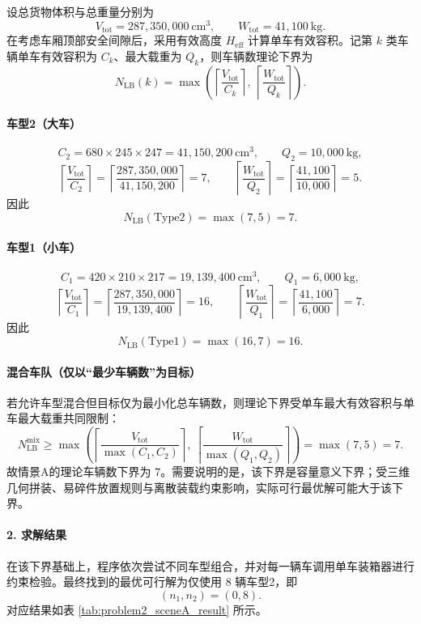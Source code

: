 \documentclass{MMCStyle}
\begin{document}
设总货物体积与总重量分别为
\[
V_{\mathrm{tot}}=287{,}350{,}000\ \mathrm{cm}^3,\qquad
W_{\mathrm{tot}}=41{,}100\ \mathrm{kg}.
\]
在考虑车厢顶部安全间隙后，采用有效高度 $H_{\mathrm{eff}}$ 计算单车有效容积。记第 $k$ 类车辆单车有效容积为 $C_k$、最大载重为 $Q_k$，则车辆数理论下界为
\[
N_{\mathrm{LB}}(k)=\max\!\left(
\left\lceil \frac{V_{\mathrm{tot}}}{C_k}\right\rceil,\ 
\left\lceil \frac{W_{\mathrm{tot}}}{Q_k}\right\rceil
\right).
\]

\paragraph{车型2（大车）}
\[
C_2=680\times245\times247=41{,}150{,}200\ \mathrm{cm}^3,\qquad Q_2=10{,}000\ \mathrm{kg},
\]
\[
\left\lceil \frac{V_{\mathrm{tot}}}{C_2}\right\rceil
=\left\lceil \frac{287{,}350{,}000}{41{,}150{,}200}\right\rceil=7,\qquad
\left\lceil \frac{W_{\mathrm{tot}}}{Q_2}\right\rceil
=\left\lceil \frac{41{,}100}{10{,}000}\right\rceil=5.
\]
因此
\[
N_{\mathrm{LB}}(\mathrm{Type2})=\max(7,5)=7.
\]

\paragraph{车型1（小车）}
\[
C_1=420\times210\times217=19{,}139{,}400\ \mathrm{cm}^3,\qquad Q_1=6{,}000\ \mathrm{kg},
\]
\[
\left\lceil \frac{V_{\mathrm{tot}}}{C_1}\right\rceil
=\left\lceil \frac{287{,}350{,}000}{19{,}139{,}400}\right\rceil=16,\qquad
\left\lceil \frac{W_{\mathrm{tot}}}{Q_1}\right\rceil
=\left\lceil \frac{41{,}100}{6{,}000}\right\rceil=7.
\]
因此
\[
N_{\mathrm{LB}}(\mathrm{Type1})=\max(16,7)=16.
\]

\paragraph{混合车队（仅以“最少车辆数”为目标）}
若允许车型混合但目标仅为最小化总车辆数，则理论下界受单车最大有效容积与单车最大载重共同限制：
\[
N_{\mathrm{LB}}^{\mathrm{mix}}
\ge
\max\!\left(
\left\lceil \frac{V_{\mathrm{tot}}}{\max(C_1,C_2)}\right\rceil,\ 
\left\lceil \frac{W_{\mathrm{tot}}}{\max(Q_1,Q_2)}\right\rceil
\right)
=
\max(7,5)=7.
\]
故情景A的理论车辆数下界为 $7$。需要说明的是，该下界是容量意义下界；受三维几何拼装、易碎件放置规则与离散装载约束影响，实际可行最优解可能大于该下界。

\paragraph{2. 求解结果}
在该下界基础上，程序依次尝试不同车型组合，并对每一辆车调用单车装箱器进行约束检验。最终找到的最优可行解为仅使用 $8$ 辆车型2，即
\begin{equation}
(n_1,n_2)=(0,8).
\end{equation}
对应结果如表 \ref{tab:problem2_sceneA_result} 所示。
\end{document}
